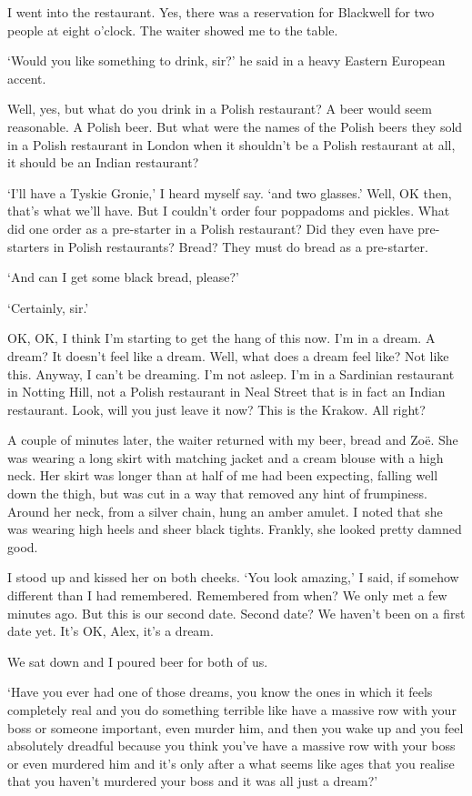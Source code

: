 I went into the restaurant. Yes, there was a reservation for
Blackwell for two people at eight o'clock. The waiter showed me to
the table.

`Would you like something to drink, sir?' he said in a heavy Eastern
European accent.

Well, yes, but what do you drink in a Polish restaurant? A beer
would seem reasonable. A Polish beer. But what were the names of the
Polish beers they sold in a Polish restaurant in London when it
shouldn't be a Polish restaurant at all, it should be an Indian
restaurant?

`I'll have a Tyskie Gronie,' I heard myself say. `and two glasses.' Well, OK then,
that's what we'll have. But I couldn't order four poppadoms and
pickles. What did one order as a pre-starter in a Polish restaurant?
Did they even have pre-starters in Polish restaurants? Bread? They
must do bread as a pre-starter.

`And can I get some black bread, please?'

`Certainly, sir.'

OK, OK, I think I'm starting to get the hang of this now. I'm in a
dream. A dream? It doesn't feel like a dream. Well, what does a
dream feel like? Not like this. Anyway, I can't be dreaming. I'm not
asleep. I'm in a Sardinian restaurant in Notting Hill, not a Polish
restaurant in Neal Street that is in fact an Indian restaurant. Look,
will you just leave it now? This is the Krakow. All right?

A couple of minutes later, the waiter returned with my beer, bread
and Zoë. She was wearing a long skirt with matching jacket and a
cream blouse with a high neck. Her skirt was longer than at half of me had been
expecting, falling well down the thigh, but was cut in a way that
removed any hint of frumpiness. Around her neck, from a silver
chain, hung an amber amulet. I noted that she was
wearing high heels and sheer black tights. Frankly, she looked pretty damned good.

I stood up and kissed her on both cheeks. `You look amazing,' I
said, if somehow different than I had remembered. Remembered from
when? We only met a few minutes ago. But this is our second date.
Second date? We haven't been on a first date yet. It's OK, Alex,
it's a dream.

We sat down and I poured beer for both of us.

`Have you ever had one of those dreams, you know the ones in which
it feels completely real and you do something terrible like have a
massive row with your boss or someone important, even murder him, and then
you wake up and you feel absolutely dreadful because you think
you've have a massive row with your boss or even murdered him and it's only after a what seems like ages that you realise that you haven't
murdered your boss and it was all just a dream?'

